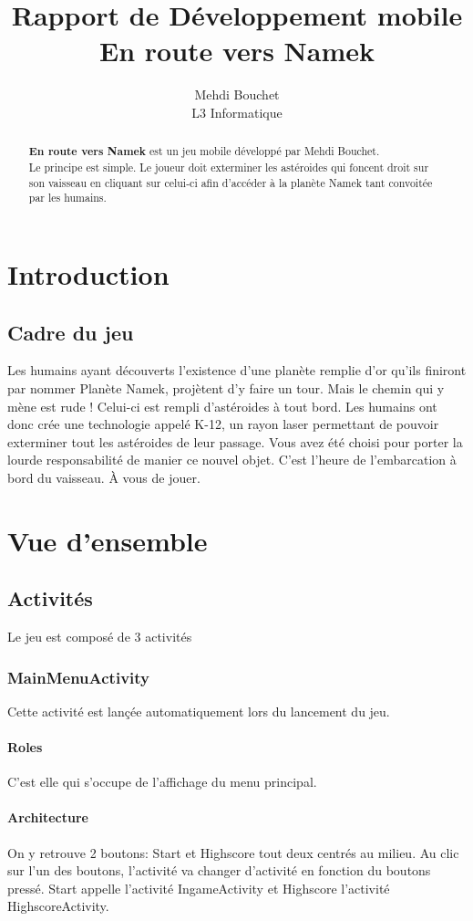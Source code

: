 \documentclass{article}
\title{Rapport de Développement mobile \\[0.2em]\smaller{} En route vers Namek}
\author{Mehdi Bouchet\\L3 Informatique}
\begin{document}
\maketitle
\begin{abstract}
\textbf{En route vers Namek} est un jeu mobile développé par Mehdi Bouchet.\\Le principe est simple. Le joueur doit exterminer les astéroides qui foncent droit sur son vaisseau en cliquant sur celui-ci afin d'accéder à la planète Namek tant convoitée par les humains.
\end{abstract}

\section{Introduction}
\subsection{Cadre du jeu}
Les humains ayant découverts l'existence d'une planète remplie d'or qu'ils finiront par nommer Planète Namek, projètent d'y faire un tour. Mais le chemin qui y mène est rude ! Celui-ci est rempli d'astéroides à tout bord. Les humains ont donc crée une technologie appelé K-12, un rayon laser permettant de pouvoir exterminer tout les astéroides de leur passage. Vous avez été choisi pour porter la lourde responsabilité de manier ce nouvel objet. C'est l'heure de l'embarcation à bord du vaisseau. À vous de jouer.

\section{Vue d'ensemble}
\subsection{Activités}
Le jeu est composé de 3 activités

\subsubsection{MainMenuActivity}
Cette activité est lançée automatiquement lors du lancement du jeu.

\paragraph{Roles}C'est elle qui s'occupe de l'affichage du menu principal.
\paragraph{Architecture}On y retrouve 2 boutons: Start et Highscore tout deux centrés au milieu. Au clic sur l'un des boutons, l'activité va changer d'activité en fonction du boutons pressé. Start appelle l'activité IngameActivity et Highscore l'activité HighscoreActivity.
\end{document}
